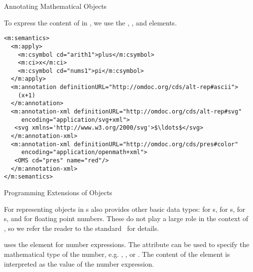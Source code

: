 \begin{omgroup}[id=annotating]{Annotating Mathematical Objects}
\begin{example}[id=semantics.ex]
  To express the content of  in \cmathml, we use the
  , , and
   elements.
\begin{lstlisting}[language=MathML,label=lst:semantics,mathescape,
                   caption={Associating Alternate Representations in \cmathml},
                   numbers=none,index={m:semantics,m:annotation-xml,m:annotation}]
<m:semantics>
  <m:apply>
    <m:csymbol cd="arith1">plus</m:csymbol>
    <m:ci>x</m:ci>
    <m:csymbol cd="nums1">pi</m:csymbol>
  </m:apply>
  <m:annotation definitionURL="http://omdoc.org/cds/alt-rep#ascii"> 
    (x+1)
  </m:annotation>
  <m:annotation-xml definitionURL="http://omdoc.org/cds/alt-rep#svg" 
     encoding="application/svg+xml">
   <svg xmlns='http://www.w3.org/2000/svg'>$\ldots$</svg>
  </m:annotation-xml>
  <m:annotation-xml definitionURL="http://omdoc.org/cds/pres#color" 
     encoding="application/openmath+xml"> 
   <OMS cd="pres" name="red"/>
  </m:annotation-xml>
</m:semantics>
\end{lstlisting}
\end{example}


\begin{omgroup}[id=om.error]{Programming Extensions of {\openmath} Objects}

\begin{definition}[id=omi.def]
  For representing objects in {s} {\openmath} also
  provides other basic data types: {} for {s},
  {} for {s}, {} for
  {s}, and {} for floating point numbers. These do
  not play a large role in the context of \omdoc, so we refer the reader to the
  {\openmath} standard~\cite{BusCapCar:2oms04} for details.
\end{definition}

\begin{definition}
  \cmathml uses the  element for number expressions. The attribute
   can be used to specify the mathematical type of the
  number, e.g. {}, {}, or {}. The content
  of the  element is interpreted as the value of the number
  expression.
\end{definition}


\end{omgroup}
\end{omgroup}
